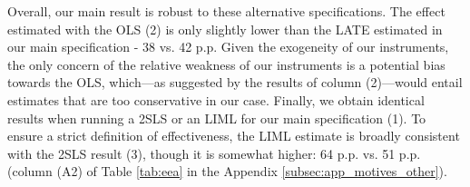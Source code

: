 \documentclass[12pt]{article} %
\begin{document}

Overall, our main result is robust to these alternative specifications. The effect estimated with the OLS (2) is only slightly lower than the LATE estimated in our main specification - 38 vs. 42 p.p. Given the exogeneity of our instruments, the only concern of the relative weakness of our instruments is a potential bias towards the OLS, which---as suggested by the results of column (2)---would entail estimates that are too conservative in our case.  Finally, we obtain identical results when running a 2SLS or an LIML for our main specification (1). To ensure a strict definition of effectiveness, the LIML estimate is broadly consistent with the 2SLS result (3), though it is somewhat higher: 64 p.p. vs. 51 p.p. (column (A2) of Table \ref{tab:eea} in the Appendix \ref{subsec:app_motives_other}). %


\end{document}
